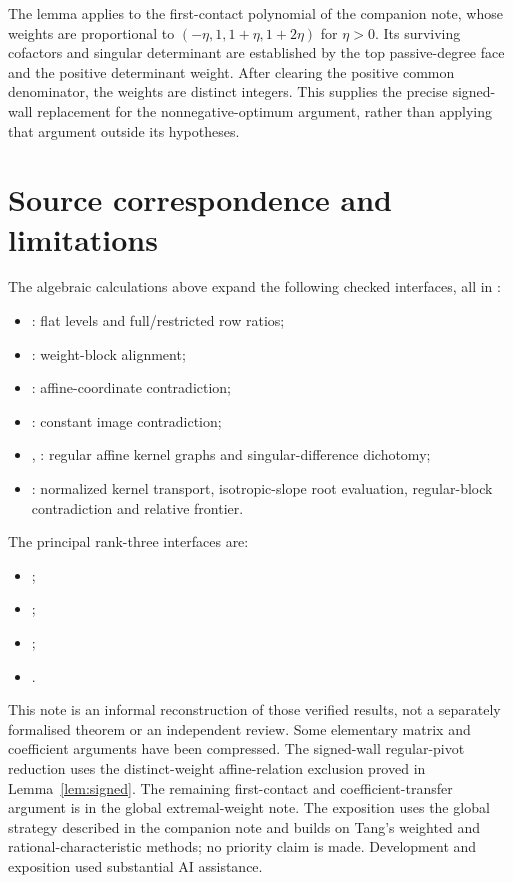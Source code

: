 \documentclass[11pt,a4paper]{article}
\begin{document}
The lemma applies to the first-contact polynomial of the companion note, whose weights are proportional to $(-\eta,1,1+\eta,1+2\eta)$ for $\eta>0$. Its surviving cofactors and singular determinant are established by the top passive-degree face and the positive determinant weight. After clearing the positive common denominator, the weights are distinct integers. This supplies the precise signed-wall replacement for the nonnegative-optimum argument, rather than applying that argument outside its hypotheses.

\section*{Source correspondence and limitations}
The algebraic calculations above expand the following checked interfaces, all in :
\begin{itemize}
\item {}: flat levels and full/restricted row ratios;
\item {}: weight-block alignment;
\item {}: affine-coordinate contradiction;
\item {}: constant image contradiction;
\item {}, : regular affine kernel graphs and singular-difference dichotomy;
\item {}: normalized kernel transport, isotropic-slope root evaluation, regular-block contradiction and relative frontier.
\end{itemize}
The principal rank-three interfaces are:
\begin{itemize}
\item {};
\item {\small{}};
\item {};
\item {}.
\end{itemize} This note is an informal reconstruction of those verified results, not a separately formalised theorem or an independent review. Some elementary matrix and coefficient arguments have been compressed. The signed-wall regular-pivot reduction uses the distinct-weight affine-relation exclusion proved in Lemma~\ref{lem:signed}. The remaining first-contact and coefficient-transfer argument is in the global extremal-weight note. The exposition uses the global strategy described in the companion note and builds on Tang's weighted and rational-characteristic methods; no priority claim is made. Development and exposition used substantial AI assistance.
\end{document}
